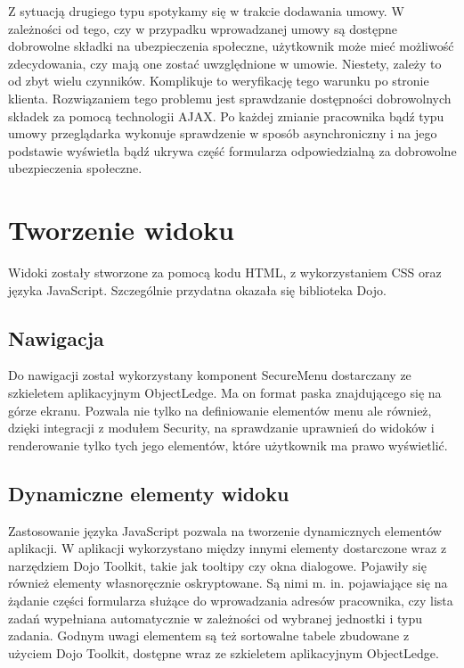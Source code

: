 Z sytuacją drugiego typu spotykamy się w trakcie dodawania umowy. W zależności od tego, czy w przypadku wprowadzanej umowy są dostępne dobrowolne składki na ubezpieczenia społeczne, użytkownik może mieć możliwość zdecydowania, czy mają one zostać uwzględnione w umowie. Niestety, zależy to od zbyt wielu czynników. Komplikuje to weryfikację tego warunku po stronie klienta. Rozwiązaniem tego problemu jest sprawdzanie dostępności dobrowolnych składek za pomocą technologii AJAX. Po każdej zmianie pracownika bądź typu umowy przeglądarka wykonuje sprawdzenie w sposób asynchroniczny i na jego podstawie wyświetla bądź ukrywa część formularza odpowiedzialną za dobrowolne ubezpieczenia społeczne.

\section[Tworzenie widoku][Tworzenie widoku]{Tworzenie widoku}
Widoki zostały stworzone za pomocą kodu HTML, z wykorzystaniem CSS oraz języka JavaScript. Szczególnie przydatna okazała się biblioteka Dojo.

\subsection[Nawigacja][Nawigacja]{Nawigacja}
Do nawigacji został wykorzystany komponent SecureMenu dostarczany ze szkieletem aplikacyjnym ObjectLedge. Ma on format paska znajdującego się na górze ekranu. Pozwala nie tylko na definiowanie elementów menu ale również, dzięki integracji z modułem Security, na sprawdzanie uprawnień do widoków i renderowanie tylko tych jego elementów, które użytkownik ma prawo wyświetlić.

\subsection[Dynamiczne elementy widoku][Dynamiczne elementy widoku]{Dynamiczne elementy widoku}
Zastosowanie języka JavaScript pozwala na tworzenie dynamicznych elementów aplikacji. W aplikacji wykorzystano między innymi elementy dostarczone wraz z narzędziem Dojo Toolkit, takie jak tooltipy czy okna dialogowe. Pojawiły się również elementy własnoręcznie oskryptowane. Są nimi m. in. pojawiające się na żądanie części formularza służące do wprowadzania adresów pracownika, czy lista zadań wypełniana automatycznie w zależności od wybranej jednostki i typu zadania. Godnym uwagi elementem są też sortowalne tabele zbudowane z użyciem Dojo Toolkit, dostępne wraz ze szkieletem aplikacyjnym ObjectLedge.


